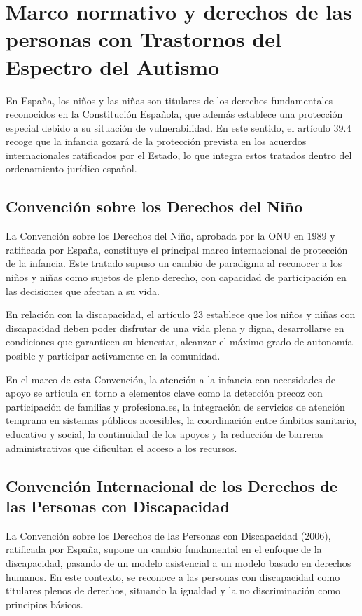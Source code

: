 \documentclass{article}
\begin{document}
\section{\textbf{Marco normativo y derechos de las personas con Trastornos del Espectro del Autismo}}
En España, los niños y las niñas son titulares de los derechos fundamentales reconocidos en la Constitución Española, que además establece una protección especial debido a su situación de vulnerabilidad. En este sentido, el artículo 39.4 recoge que la infancia gozará de la protección prevista en los acuerdos internacionales ratificados por el Estado, lo que integra estos tratados dentro del ordenamiento jurídico español.

\subsection{\textbf{Convención sobre los Derechos del Niño}}
La Convención sobre los Derechos del Niño, aprobada por la ONU en 1989 y ratificada por España, constituye el principal marco internacional de protección de la infancia. Este tratado supuso un cambio de paradigma al reconocer a los niños y niñas como sujetos de pleno derecho, con capacidad de participación en las decisiones que afectan a su vida.

En relación con la discapacidad, el artículo 23 establece que los niños y niñas con discapacidad deben poder disfrutar de una vida plena y digna, desarrollarse en condiciones que garanticen su bienestar, alcanzar el máximo grado de autonomía posible y participar activamente en la comunidad.

En el marco de esta Convención, la atención a la infancia con necesidades de apoyo se articula en torno a elementos clave como la detección precoz con participación de familias y profesionales, la integración de servicios de atención temprana en sistemas públicos accesibles, la coordinación entre ámbitos sanitario, educativo y social, la continuidad de los apoyos y la reducción de barreras administrativas que dificultan el acceso a los recursos.

\subsection{\textbf{Convención Internacional de los Derechos de las Personas con Discapacidad}}
La Convención sobre los Derechos de las Personas con Discapacidad (2006), ratificada por España, supone un cambio fundamental en el enfoque de la discapacidad, pasando de un modelo asistencial a un modelo basado en derechos humanos. En este contexto, se reconoce a las personas con discapacidad como titulares plenos de derechos, situando la igualdad y la no discriminación como principios básicos.
\end{document}
